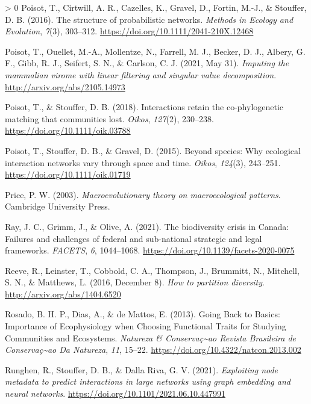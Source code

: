 \documentclass[10pt,oneside]{article}
\newlength{\cslhangindent}
\newenvironment{CSLReferences}[3] %
 {%
  \setlength{\parindent}{0pt}
  \ifodd #1 \everypar{\setlength{\hangindent}{\cslhangindent}}\ignorespaces\fi
  \ifnum #2 > 0
  \setlength{\parskip}{#2\baselineskip}
  \fi
 }%
 {}
\begin{document}
\begin{CSLReferences}{1}{0}
\leavevmode\hypertarget{ref-Poisot2016StrPro}{}%
Poisot, T., Cirtwill, A. R., Cazelles, K., Gravel, D., Fortin, M.-J., \&
Stouffer, D. B. (2016). The structure of probabilistic networks.
\emph{Methods in Ecology and Evolution}, \emph{7}(3), 303--312.
\url{https://doi.org/10.1111/2041-210X.12468}

\leavevmode\hypertarget{ref-Poisot2021ImpMam}{}%
Poisot, T., Ouellet, M.-A., Mollentze, N., Farrell, M. J., Becker, D.
J., Albery, G. F., Gibb, R. J., Seifert, S. N., \& Carlson, C. J. (2021,
May 31). \emph{Imputing the mammalian virome with linear filtering and
singular value decomposition}. \url{http://arxiv.org/abs/2105.14973}

\leavevmode\hypertarget{ref-Poisot2018IntRet}{}%
Poisot, T., \& Stouffer, D. B. (2018). Interactions retain the
co-phylogenetic matching that communities lost. \emph{Oikos},
\emph{127}(2), 230--238. \url{https://doi.org/10.1111/oik.03788}

\leavevmode\hypertarget{ref-Poisot2015SpeWhy}{}%
Poisot, T., Stouffer, D. B., \& Gravel, D. (2015). Beyond species: Why
ecological interaction networks vary through space and time.
\emph{Oikos}, \emph{124}(3), 243--251.
\url{https://doi.org/10.1111/oik.01719}

\leavevmode\hypertarget{ref-Price2003MacThe}{}%
Price, P. W. (2003). \emph{Macroevolutionary theory on macroecological
patterns}. Cambridge University Press.

\leavevmode\hypertarget{ref-Ray2021BioCri}{}%
Ray, J. C., Grimm, J., \& Olive, A. (2021). The biodiversity crisis in
Canada: Failures and challenges of federal and sub-national strategic
and legal frameworks. \emph{FACETS}, \emph{6}, 1044--1068.
\url{https://doi.org/10.1139/facets-2020-0075}

\leavevmode\hypertarget{ref-Reeve2016HowPar}{}%
Reeve, R., Leinster, T., Cobbold, C. A., Thompson, J., Brummitt, N.,
Mitchell, S. N., \& Matthews, L. (2016, December 8). \emph{How to
partition diversity}. \url{http://arxiv.org/abs/1404.6520}

\leavevmode\hypertarget{ref-Rosado2013GoiBac}{}%
Rosado, B. H. P., Dias, A., \& de Mattos, E. (2013). Going Back to
Basics: Importance of Ecophysiology when Choosing Functional Traits for
Studying Communities and Ecosystems. \emph{Natureza \&
Conservaç\textasciitilde ao Revista Brasileira de
Conservaç\textasciitilde ao Da Natureza}, \emph{11}, 15--22.
\url{https://doi.org/10.4322/natcon.2013.002}

\leavevmode\hypertarget{ref-Runghen2021ExpNod}{}%
Runghen, R., Stouffer, D. B., \& Dalla Riva, G. V. (2021).
\emph{Exploiting node metadata to predict interactions in large networks
using graph embedding and neural networks}.
\url{https://doi.org/10.1101/2021.06.10.447991}


\end{CSLReferences}
\end{document}
